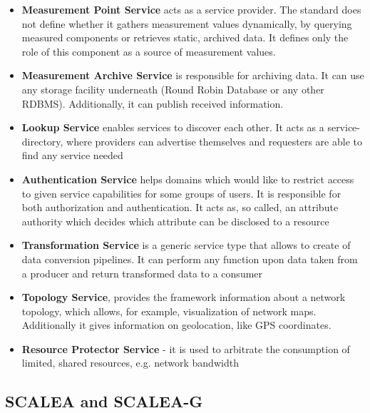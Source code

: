 \begin{itemize}

\item{ {\bf Measurement Point Service} acts as a service provider. The standard does not define whether it gathers measurement values dynamically, by querying measured components or retrieves static, archived data. It defines only the role of this component as a source of measurement values.}

\item{ {\bf Measurement Archive Service} is responsible for archiving data. It can use any storage facility underneath (Round Robin Database or any other RDBMS). Additionally, it can publish received information. }

\item{ {\bf Lookup Service} enables services to discover each other. It acts as a service-directory, where providers can advertise themselves and requesters are able to find any service needed}

\item{ {\bf Authentication Service} helps domains which would like to restrict access to given service capabilities for some groups of users. It is responsible for both authorization and authentication. It acts as, so called, an attribute authority which decides which attribute can be disclosed to a resource}

\item{ {\bf Transformation Service} is a generic service type that allows to create of data conversion pipelines. It can perform any function upon data taken from a producer and return transformed data to a consumer}

\item{ {\bf Topology Service}, provides the framework information about a network topology, which allows, for example, visualization of network maps. Additionally it gives information on geolocation, like GPS coordinates.}

\item{ {\bf Resource Protector Service} - it is used to arbitrate the consumption of limited, shared resources, e.g. network bandwidth} \end{itemize}


\subsection{SCALEA and SCALEA-G}


